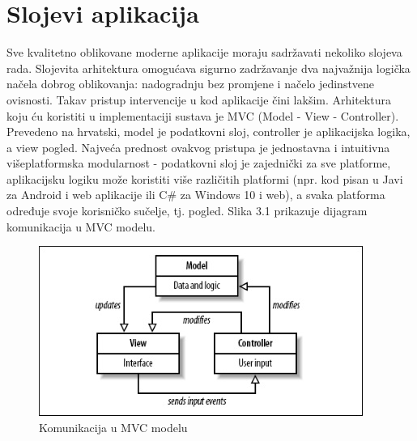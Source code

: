 \documentclass[times, utf8, zavrsni, numeric]{fer}
\begin{document}
\chapter{Slojevi aplikacija}
Sve kvalitetno oblikovane moderne aplikacije moraju sadržavati nekoliko slojeva rada. Slojevita arhitektura omogućava sigurno zadržavanje dva najvažnija logička načela dobrog oblikovanja: nadogradnju bez promjene i načelo jedinstvene ovisnosti. Takav pristup intervencije u kod aplikacije čini lakšim. Arhitektura koju ću koristiti u implementaciji sustava je MVC (Model - View - Controller). Prevedeno na hrvatski, model je podatkovni sloj, controller je aplikacijska logika, a view pogled. Najveća prednost ovakvog pristupa je jednostavna i intuitivna višeplatformska modularnost - podatkovni sloj je zajednički za sve platforme, aplikacijsku logiku može koristiti više različitih platformi (npr. kod pisan u Javi za Android i web aplikacije ili C\# za Windows 10 i web), a svaka platforma određuje svoje korisničko sučelje, tj. pogled.\citep{mvc} Slika 3.1 prikazuje dijagram komunikacija u MVC modelu.

\begin{figure}[htb]
	\centering
	\includegraphics[]{img/mvc.jpg}
	\caption{Komunikacija u MVC modelu\citep{mvccommpic}}
	\label{fig:mvc}
\end{figure}
\end{document}
